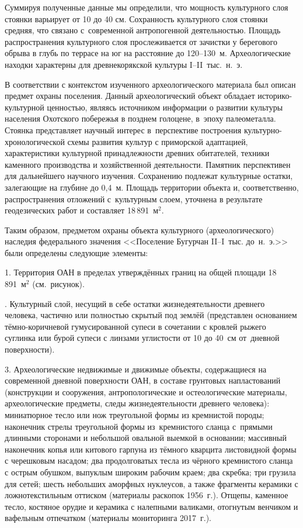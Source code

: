 Суммируя полученные данные мы определили, что мощность культурного слоя стоянки варьирует от 10 до 40 см. Сохранность культурного слоя стоянки средняя, что связано с~современной антропогенной деятельностью. Площадь распространения культурного слоя прослеживается от зачистки у берегового обрыва в глубь по террасе на юг на расстояние до 120--130~м. Археологические находки характерны для древнекорякской культуры I--II~тыс.~н.~э.

В соответствии с контекстом изученного археологического материала был описан предмет охраны поселения. Данный археологический объект обладает историко-культурной ценностью, являясь источником информации о развитии культуры населения Охотского побережья в позднем голоцене, в~эпоху палеометалла. Стоянка представляет научный интерес в~перспективе построения культурно-хронологической схемы развития культур с приморской адаптацией, характеристики культурной принадлежности древних обитателей, техники каменного производства и хозяйственной деятельности. Памятник перспективен для дальнейшего научного изучения. Сохранению подлежат культурные остатки, залегающие на глубине до 0,4~м. Площадь территории объекта и, соответственно, распространения отложений с~культурным слоем, уточнена в результате геодезических работ и составляет 18\,891~м$^2$.

Таким образом, предметом охраны объекта культурного (археологического) наследия федерального значения <<Поселение Бугурчан II--I~тыс. до~н.~э.>> были определены следующие элементы:

1. Территория ОАН в пределах утверждённых границ на общей площади  18\,891~м$^2$ (см.~рисунок).


. Культурный слой, несущий в себе остатки жизнедеятельности древнего человека, частично или полностью скрытый под землёй (представлен основанием тёмно-коричневой гумусированной супеси в сочетании с кровлей рыжего суглинка или бурой супеси с линзами углистости от 10 до 40~см от~дневной поверхности).

3. Археологические недвижимые и движимые объекты, содержащиеся на современной дневной поверхности ОАН, в составе грунтовых напластований (конструкции и сооружения, антропологические и остеологические материалы, археологические предметы, следы жизнедеятельности древнего человека): миниатюрное тесло или нож треугольной формы из кремнистой породы; наконечник стрелы треугольной формы из~кремнистого сланца с~прямыми длинными сто­ронами и небольшой овальной выемкой в основании; массивный наконечник копья или китового гарпуна из тёмного кварцита листовидной формы с черешковым насадом; два продолговатых тесла из чёрного кремнистого сланца с острым обушком, выпуклым широким рабочим краем; два скребка; три грузила для сетей; шесть небольших аморфных нуклеусов, а также фрагменты керамики с ложнотекстильным оттиском (материалы раскопок 1956~г.). Отщепы, каменное тесло, костяное орудие и керамика с налепными валиками, отогнутым венчиком и вафельным отпечатком (материалы мониторинга 2017~г.).

